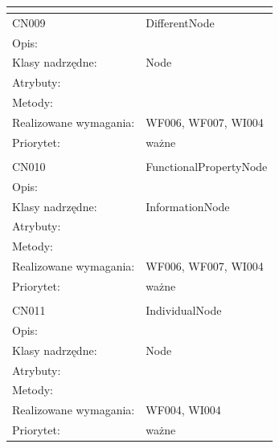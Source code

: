 \documentclass[a4paper,10pt]{article}
\begin{document}
\begin{center}
\begin{longtable}{|m{3cm}|m{9cm}|}
\multicolumn{2}{c}{} \\
 \hline

CN009 & DifferentNode \\ \hline
Opis: &     \\ \hline
Klasy nadrzędne: & Node     \\ \hline
Atrybuty: & %
 \\ \hline
Metody: & %
  \\ \hline
Realizowane wymagania: & WF006, WF007, WI004 \\ \hline
Priorytet: & ważne  \\ \hline

\multicolumn{2}{c}{} \\
 \hline

CN010 & FunctionalPropertyNode \\ \hline
Opis: &     \\ \hline
Klasy nadrzędne: & InformationNode     \\ \hline
Atrybuty: & %
 \\ \hline
Metody: & %
  \\ \hline
Realizowane wymagania: & WF006, WF007, WI004 \\ \hline
Priorytet: & ważne  \\ \hline

\multicolumn{2}{c}{} \\
 \hline

CN011 & IndividualNode \\ \hline
Opis: &     \\ \hline
Klasy nadrzędne: & Node     \\ \hline
Atrybuty: & %
 \\ \hline
Metody: & %
  \\ \hline
Realizowane wymagania: & WF004, WI004 \\ \hline
Priorytet: & ważne  \\ \hline


\end{longtable}
\end{center}
\end{document}
